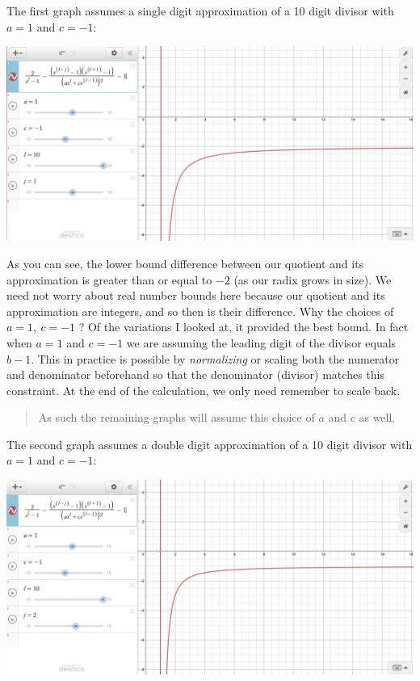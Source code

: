 \documentclass[twoside]{article}
\begin{document}
The first graph assumes a single digit approximation of a 10 digit divisor with $ a=1 $ and $ c=-1 $:

\includegraphics[width=6in]{lower-l10-j1-a1-c1.png}

As you can see, the lower bound difference between our quotient and its approximation is greater than or equal to
$ -2 $ (as our radix grows in size).  We need not worry about real number bounds here because our quotient and its
approximation are integers, and so then is their difference.  Why the choices of $ a=1,\ c=-1 $ ? Of the variations
I looked at, it provided the best bound. In fact when $ a=1 $ and $ c=-1 $ we are assuming the leading digit of
the divisor equals $ b-1 $. This in practice is possible by \emph{normalizing} or scaling both the numerator
and denominator beforehand so that the denominator (divisor) matches this constraint. At the end of the
calculation, we only need remember to scale back.

\begin{verse}
As such the remaining graphs will assume this choice of $ a $ and $ c $ as well.
\end{verse}

The second graph assumes a double digit approximation of a 10 digit divisor with $ a=1 $ and $ c=-1 $:

\includegraphics[width=6in]{lower-l10-j2-a1-c1.png}
\end{document}
